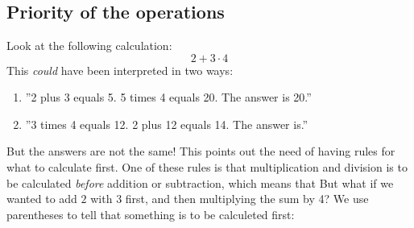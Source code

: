 



\section{\rrek}
\subsection*{Priority of the operations}
Look at the following calculation:
\[ 2+3\cdot4 \]
This \textsl{could} have been interpreted in two ways:
\begin{enumerate}
	\item ''2 plus 3 equals 5. 5 times 4 equals 20. The answer is 20.''
	\item ''3 times 4 equals 12. 2 plus 12 equals 14. The answer is.''
\end{enumerate}
But the answers are not the same! This points out the need of having rules for what to calculate first. One of these rules is that multiplication and division is to be calculated \textsl{before} addition or subtraction, which means that \regv
\st{ \vs
{}
}
But what if we wanted to add $ 2 $ with $ 3 $ first, and then multiplying the sum by 4? We use parentheses to tell that something is to be calculeted first: \regv
\st{\vs
{}
}\regv

\newpage
{}
